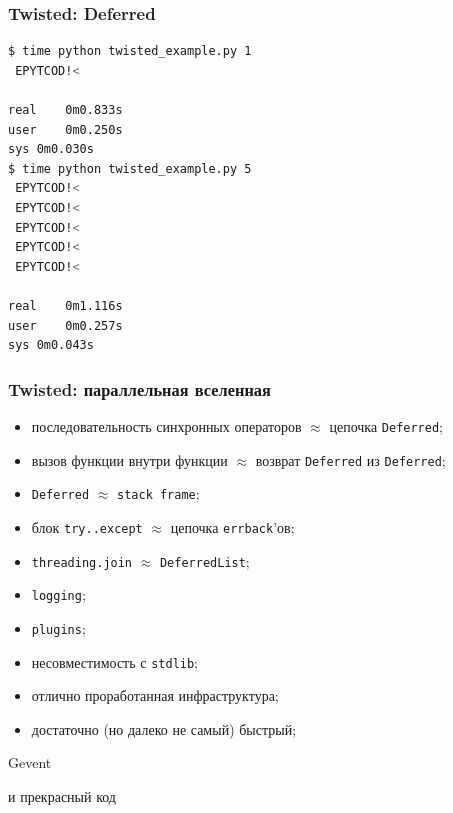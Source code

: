 \documentclass[aspectratio=169]{beamer}
\begin{document}
\begin{frame}[fragile]
  \frametitle{Twisted: Deferred}
  \begin{lstlisting}[language=sh]
$ time python twisted_example.py 1
 EPYTCOD!<

real	0m0.833s
user	0m0.250s
sys	0m0.030s
$ time python twisted_example.py 5
 EPYTCOD!<
 EPYTCOD!<
 EPYTCOD!<
 EPYTCOD!<
 EPYTCOD!<

real	0m1.116s
user	0m0.257s
sys	0m0.043s
  \end{lstlisting}
\end{frame}


\begin{frame}
  \frametitle{Twisted: параллельная вселенная}
  \begin{itemize}
    \item последовательность синхронных операторов $\approx$ цепочка {\tt Deferred};
    \item вызов функции внутри функции $\approx$ возврат {\tt Deferred} из {\tt Deferred};
    \item {\tt Deferred} $\approx$ {\tt stack frame};
    \item блок {\tt try..except} $\approx$ цепочка {\tt errback}'ов;
    \item {\tt threading.join}  $\approx$ {\tt DeferredList};
  \end{itemize}
  \pause

  \vspace{0.5cm}
  \begin{itemize}
    \item {\tt logging};
    \item {\tt plugins};
    \item несовместимость с {\tt stdlib};
    \item отлично проработанная инфраструктура;
    \item достаточно (но далеко не самый) быстрый;
  \end{itemize}

\end{frame}


\begin{frame}
  \begin{center}
    {\Huge Gevent}

    и прекрасный код
  \end{center}
\end{frame}
\end{document}
